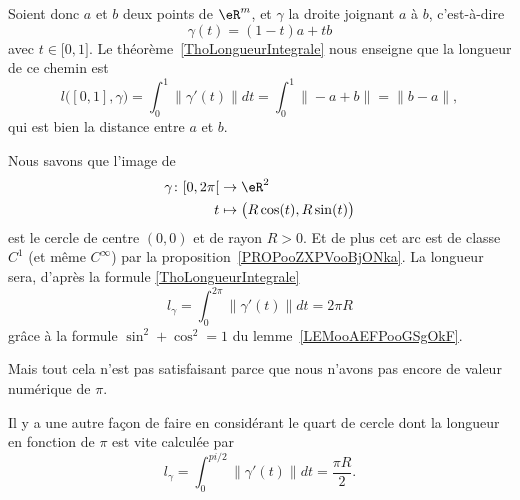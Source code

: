 \begin{example}
	Soient donc $a$ et $b$ deux points de $\eR^m$, et $\gamma$ la droite joignant $a$ à $b$, c'est-à-dire
	\begin{equation}
		\gamma(t)=(1-t)a+tb
	\end{equation}
	avec $t\in\mathopen[ 0 , 1 \mathclose]$. Le théorème~\ref{ThoLongueurIntegrale} nous enseigne que la longueur de ce chemin est
	\begin{equation}
		l\big( [0,1],\gamma \big)=\int_0^1\| \gamma'(t) \|dt=\int_0^1\| -a+b \|=\| b-a \|,
	\end{equation}
	qui est bien la distance entre $a$ et $b$.
\end{example}

\begin{example}
	Nous savons que l'image de
	\begin{equation}
		\begin{aligned}
			\gamma\colon \mathopen[ 0 , 2\pi \mathclose[ & \to \eR^2                             \\
			t                                            & \mapsto \big( R\cos(t),R\sin(t) \big)
		\end{aligned}
	\end{equation}
	est le cercle de centre \( (0,0)\) et de rayon \( R>0\). Et de plus cet arc est de classe \( C^1\) (et même \(  C^{\infty}\)) par la proposition~\ref{PROPooZXPVooBjONka}. La longueur sera, d'après la formule \eqref{ThoLongueurIntegrale}
	\begin{equation}
		l_{\gamma}=\int_0^{2\pi}\| \gamma'(t) \|dt=2\pi R
	\end{equation}
	grâce à la formule \( \sin^2+\cos^2=1\) du lemme~\ref{LEMooAEFPooGSgOkF}.

	Mais tout cela n'est pas satisfaisant parce que nous n'avons pas encore de valeur numérique de \( \pi\).

	Il y a une autre façon de faire en considérant le quart de cercle dont la longueur en fonction de \( \pi\) est vite calculée par
	\begin{equation}
		l_{\gamma}=\int_0^{pi/2}\| \gamma'(t) \|dt=\frac{ \pi R }{ 2 }.
	\end{equation}


\end{example}
